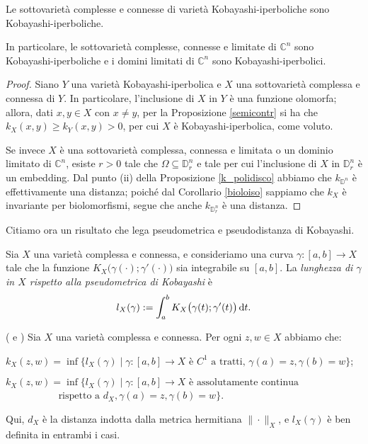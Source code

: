 \begin{cor}\label{kobisdist}
    Le sottovarietà complesse e connesse di varietà Kobayashi-iperboliche sono Kobayashi-iperboliche.
    
    In particolare, le sottovarietà complesse, connesse e limitate di $\mathbb{C}^n$ sono Kobayashi-iperboliche e i domini limitati di $\mathbb{C}^n$ sono Kobayashi-iperbolici.
\end{cor}
\begin{proof}
    Siano $Y$ una varietà Kobayashi-iperbolica e $X$ una sottovarietà complessa e connessa di $Y$. In particolare, l'inclusione di $X$ in $Y$ è una funzione olomorfa; allora, dati $x,y\in X$ con $x\not=y$, per la Proposizione \ref{semicontr} si ha che $k_X(x,y)\ge k_Y(x,y)>0$, per cui $X$ è Kobayashi-iperbolica, come voluto.

    Se invece $X$ è una sottovarietà complessa, connessa e limitata o un dominio limitato di $\mathbb{C}^n$, esiste $r>0$ tale che $\Omega\subseteq\mathbb{D}_r^n$ e tale per cui l'inclusione di $X$ in $\mathbb{D}_r^n$ è un embedding. Dal punto (ii) della Proposizione \ref{k_polidisco} abbiamo che $k_{\mathbb{D}^n}$ è effettivamente una distanza; poiché dal Corollario \ref{bioloiso} sappiamo che $k_X$ è invariante per biolomorfismi, segue che anche $k_{\mathbb{D}_r^n}$ è una distanza.
\end{proof}

Citiamo ora un risultato che lega pseudometrica e pseudodistanza di Kobayashi.

\begin{defn} \label{lung_X}
    Sia $X$ una varietà complessa e connessa, e consideriamo una curva $\gamma:[a,b] \longrightarrow X$ tale che la funzione $K_X\big(\gamma(\cdot);\gamma'(\cdot)\big)$ sia integrabile su $[a,b]$. La \textit{lunghezza di $\gamma$ in $X$ rispetto alla pseudometrica di Kobayashi} è
    $$l_X(\gamma):=\int_a^b K_X\big(\gamma(t);\gamma'(t)\big)\mathop{}\!\mathrm{d} t.$$
\end{defn}

\begin{thm} \label{lung_int}
    (\cite[Theorem 1]{Roy} e \cite[Theorem 3.1]{V}) Sia $X$ una varietà complessa e connessa. Per ogni $z,w \in X$ abbiamo che:
    \begin{nlist}
        \item $k_X(z,w)=\inf\{l_X(\gamma) \mid \gamma:[a,b] \longrightarrow X\text{ è $C^1$ a tratti, }\gamma(a)=z,\gamma(b)=w\}$;
        \item $k_X(z,w)=\inf\{l_X(\gamma) \mid \gamma:[a,b] \longrightarrow X\text{ è assolutamente continua}$\\
        $\text{    }\qquad\qquad\,\,\,\,\text{rispetto a } d_X,\gamma(a)=z,\gamma(b)=w\}$.
    \end{nlist}

    Qui, $d_X$ è la distanza indotta dalla metrica hermitiana $\|\cdot\|_X$, e $l_X(\gamma)$ è ben definita in entrambi i casi.
\end{thm}


